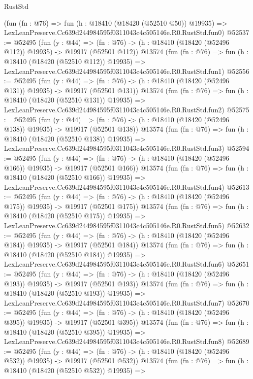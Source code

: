 \begin{lexlean}{RustStd}
\begin{coremodule}
    (fun (fn : @76) =>
    fun (h : @18410 (@18420 (@52510 @50)) @19935) =>
    LexLeanPreserve.Cc639d244984595f0311043c4c505146e.R0.RustStd.fun0)
@52537 := @52495
    (fun (y : @44) =>
    (fn : @76) -> (h : @18410 (@18420 (@52496 @112)) @19935) -> @19917 (@52501 @112))
    @13574
    (fun (fn : @76) =>
    fun (h : @18410 (@18420 (@52510 @112)) @19935) =>
    LexLeanPreserve.Cc639d244984595f0311043c4c505146e.R0.RustStd.fun1)
@52556 := @52495
    (fun (y : @44) =>
    (fn : @76) -> (h : @18410 (@18420 (@52496 @131)) @19935) -> @19917 (@52501 @131))
    @13574
    (fun (fn : @76) =>
    fun (h : @18410 (@18420 (@52510 @131)) @19935) =>
    LexLeanPreserve.Cc639d244984595f0311043c4c505146e.R0.RustStd.fun2)
@52575 := @52495
    (fun (y : @44) =>
    (fn : @76) -> (h : @18410 (@18420 (@52496 @138)) @19935) -> @19917 (@52501 @138))
    @13574
    (fun (fn : @76) =>
    fun (h : @18410 (@18420 (@52510 @138)) @19935) =>
    LexLeanPreserve.Cc639d244984595f0311043c4c505146e.R0.RustStd.fun3)
@52594 := @52495
    (fun (y : @44) =>
    (fn : @76) -> (h : @18410 (@18420 (@52496 @166)) @19935) -> @19917 (@52501 @166))
    @13574
    (fun (fn : @76) =>
    fun (h : @18410 (@18420 (@52510 @166)) @19935) =>
    LexLeanPreserve.Cc639d244984595f0311043c4c505146e.R0.RustStd.fun4)
@52613 := @52495
    (fun (y : @44) =>
    (fn : @76) -> (h : @18410 (@18420 (@52496 @175)) @19935) -> @19917 (@52501 @175))
    @13574
    (fun (fn : @76) =>
    fun (h : @18410 (@18420 (@52510 @175)) @19935) =>
    LexLeanPreserve.Cc639d244984595f0311043c4c505146e.R0.RustStd.fun5)
@52632 := @52495
    (fun (y : @44) =>
    (fn : @76) -> (h : @18410 (@18420 (@52496 @184)) @19935) -> @19917 (@52501 @184))
    @13574
    (fun (fn : @76) =>
    fun (h : @18410 (@18420 (@52510 @184)) @19935) =>
    LexLeanPreserve.Cc639d244984595f0311043c4c505146e.R0.RustStd.fun6)
@52651 := @52495
    (fun (y : @44) =>
    (fn : @76) -> (h : @18410 (@18420 (@52496 @193)) @19935) -> @19917 (@52501 @193))
    @13574
    (fun (fn : @76) =>
    fun (h : @18410 (@18420 (@52510 @193)) @19935) =>
    LexLeanPreserve.Cc639d244984595f0311043c4c505146e.R0.RustStd.fun7)
@52670 := @52495
    (fun (y : @44) =>
    (fn : @76) -> (h : @18410 (@18420 (@52496 @395)) @19935) -> @19917 (@52501 @395))
    @13574
    (fun (fn : @76) =>
    fun (h : @18410 (@18420 (@52510 @395)) @19935) =>
    LexLeanPreserve.Cc639d244984595f0311043c4c505146e.R0.RustStd.fun8)
@52689 := @52495
    (fun (y : @44) =>
    (fn : @76) -> (h : @18410 (@18420 (@52496 @532)) @19935) -> @19917 (@52501 @532))
    @13574
    (fun (fn : @76) =>
    fun (h : @18410 (@18420 (@52510 @532)) @19935) =>

\end{coremodule}
\end{lexlean}
